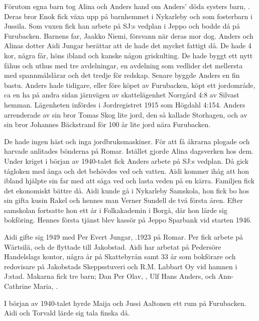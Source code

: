 Förutom egna barn tog Alina och Anders hand om Anders' döda systers barn, . Deras bror Enok fick växa upp på barnhemmet i Nykarleby och som fosterbarn i Jussila. Som vuxen fick han arbete på SJ:s vedplan i Jeppo och bodde då på Furubacken. Barnens far, Jaakko Niemi, försvann när deras mor dog. Anders och Alinas dotter Aidi Jungar berättar att de hade det mycket fattigt då. De hade 4 kor, några får, höns ibland och kanske någon griskulting. De hade byggt ett nytt fähus och uthus med tre avdelningar, en avdelning som 	vedlider det mellersta med spannmålslårar och det tredje för redskap. Senare byggde Anders en fin bastu. Anders hade tidigare, eller före köpet	av Furubacken, köpt ett jordområde, ca en ha på andra sidan järnvägen av skattelägenhet Norrgård 4:8 av Silvast hemman. Lägenheten infördes i Jordregistret 1915 som Högdahl 4:154. Anders arrenderade av sin bror Tomas Skog lite jord, den så kallade Storhagen, och av sin bror Johannes Bäckstrand för 100 år lite jord nära Furubacken.

De hade ingen häst och inga jordbruksmaskiner. För att få åkrarna plogade och harvade anlitades bönderna på Romar. Istället gjorde Alina dagsverken hos dem. Under kriget i början av 1940-talet fick Anders arbete på SJ:s vedplan. Då gick tågloken med ånga och det behövdes ved och vatten. Aidi kommer ihåg att hon ibland hjälpte sin far med att såga ved och lasta veden på en kärra. Familjen fick det ekonomiskt bättre då. Aidi kunde gå i Nykarleby Samskola, hon fick bo hos sin gifta kusin Rakel och hennes man Verner Sundell de två första åren. Efter samskolan fortsatte hon ett år i Folkakademin i Borgå, där hon lärde sig bokföring. Hennes första tjänst blev kassör på Jeppo Sparbank vid starten 1946.


Aidi gifte sig 1949 med Per Evert Jungar, .1923 på Romar. Per fick arbete på Wärtsilä, och de flyttade till Jakobstad. Aidi har arbetat på Pedersöre Handelslags kontor, några år på Skattebyrån samt 33 år som bokförare och redovisare på Jakobstads Skeppsstuveri och R.M. Labbart Oy vid hamnen i J:stad. Makarna fick tre barn; Dan Per Olav, , Ulf Hans Anders,  och Ann-Cathrine Maria, .

I början av 1940-talet hyrde Maija och Jussi Aaltonen ett rum på Furubacken. Aidi och Torvald lärde sig tala finska då.


